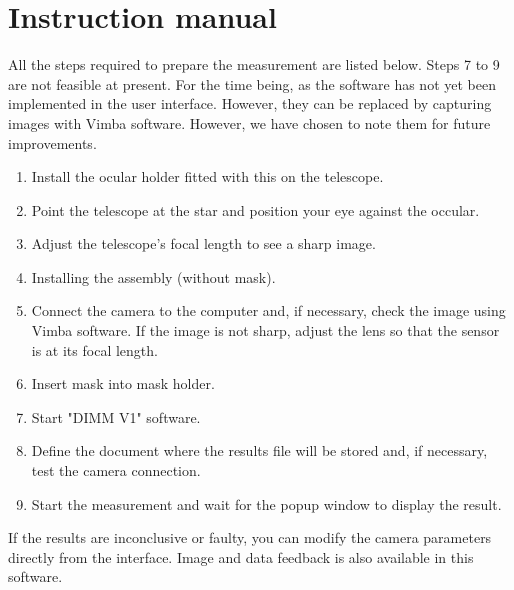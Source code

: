 \section{Instruction manual}
All the steps required to prepare the measurement are listed below. Steps 7 to 9 are not feasible at present.
For the time being, as the software has not yet been implemented in the user interface. However, they can be replaced by capturing images with Vimba software. However, we have chosen to note them for future improvements.
\begin{enumerate}
    \item Install the ocular holder fitted with this on the telescope.
    \item Point the telescope at the star and position your eye against the occular.
    \item Adjust the telescope's focal length to see a sharp image.
    \item Installing the assembly (without mask).
    \item Connect the camera to the computer and, if necessary, check the image using Vimba software. 
    If the image is not sharp, adjust the lens so that the sensor is at its focal length.
    \item Insert mask into mask holder.
    \item Start "DIMM V1" software.
    \item Define the document where the results file will be stored and, if necessary, test the camera connection.
    \item Start the measurement and wait for the popup window to display the result.
\end{enumerate}
If the results are inconclusive or faulty, you can modify the camera parameters directly from the interface.
Image and data feedback is also available in this software.